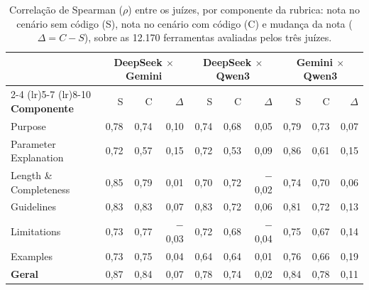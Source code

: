 \begin{table}[H]
\centering
\caption{Correlação de Spearman ($\rho$) entre os juízes, por componente da rubrica: nota no cenário sem código (S), nota no cenário com código (C) e mudança da nota ($\Delta = C - S$), sobre as 12.170 ferramentas avaliadas pelos três juízes.}
\label{tab:correlacao-juizes}
\footnotesize
\setlength{\tabcolsep}{3.5pt}
\begin{tabular}{lrrrrrrrrr}
\toprule
 & \multicolumn{3}{c}{\textbf{DeepSeek $\times$ Gemini}} & \multicolumn{3}{c}{\textbf{DeepSeek $\times$ Qwen3}} & \multicolumn{3}{c}{\textbf{Gemini $\times$ Qwen3}} \\
\cmidrule(lr){2-4} \cmidrule(lr){5-7} \cmidrule(lr){8-10}
\textbf{Componente} & S & C & $\Delta$ & S & C & $\Delta$ & S & C & $\Delta$ \\
\midrule
Purpose & 0,78 & 0,74 & 0,10 & 0,74 & 0,68 & 0,05 & 0,79 & 0,73 & 0,07 \\
Parameter Explanation & 0,72 & 0,57 & 0,15 & 0,72 & 0,53 & 0,09 & 0,86 & 0,61 & 0,15 \\
Length \& Completeness & 0,85 & 0,79 & 0,01 & 0,70 & 0,72 & $-$0,02 & 0,74 & 0,70 & 0,06 \\
Guidelines & 0,83 & 0,83 & 0,07 & 0,83 & 0,72 & 0,06 & 0,81 & 0,72 & 0,13 \\
Limitations & 0,73 & 0,77 & $-$0,03 & 0,72 & 0,68 & $-$0,04 & 0,75 & 0,67 & 0,14 \\
Examples & 0,73 & 0,75 & 0,04 & 0,64 & 0,64 & 0,01 & 0,76 & 0,66 & 0,19 \\
\midrule
\textbf{Geral} & 0,87 & 0,84 & 0,07 & 0,78 & 0,74 & 0,02 & 0,84 & 0,78 & 0,11 \\
\bottomrule
\end{tabular}
\end{table}

